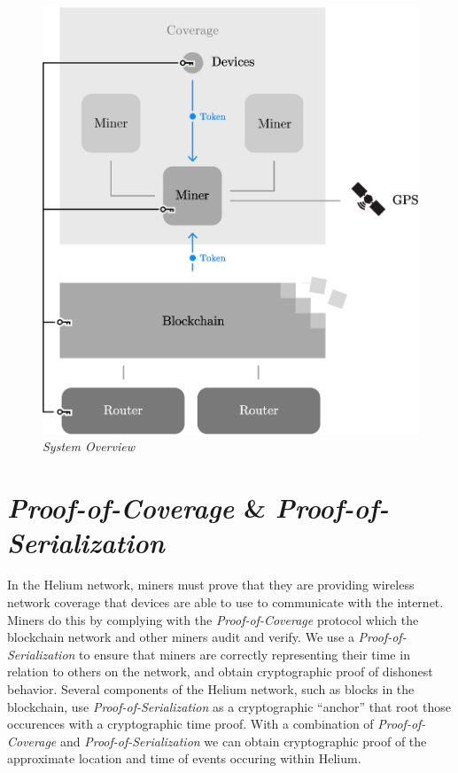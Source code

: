 \documentclass[letterpaper,11pt]{article}
\def\proofofcoverage/{\emph{Proof-of-Coverage}}
\begin{document}
\begin{figure}[H]
	\begin{center}
  		\includegraphics[width=\textwidth]{diagram1.eps}
  		\caption{\emph{System Overview}}
  		\label{fig:system}
 	\end{center}
\end{figure}

\newpage

\section{\proofofcoverage/ \& \emph{Proof-of-Serialization}} \label{poc}

In the Helium network, miners must prove that they are providing wireless network coverage that devices are able to use to communicate with the internet. Miners do this by complying with the \emph{Proof-of-Coverage} protocol which the blockchain network and other miners audit and verify. We use a \emph{Proof-of-Serialization} to ensure that miners are correctly representing their time in relation to others on the network, and obtain cryptographic proof of dishonest behavior. Several components of the Helium network, such as blocks in the blockchain, use \emph{Proof-of-Serialization} as a cryptographic ``anchor'' that root those occurences  with a cryptographic time proof. With a combination of \proofofcoverage/ and \emph{Proof-of-Serialization} we can obtain cryptographic proof of the approximate location and time of events occuring within Helium. \newline
\end{document}
